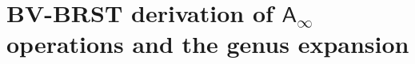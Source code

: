 %

\providecommand{\fg}{\mathfrak{g}}
\providecommand{\fh}{\mathfrak{h}}
\providecommand{\cA}{\mathcal{A}}
\providecommand{\cO}{\mathcal{O}}
\providecommand{\cM}{\mathcal{M}}
\providecommand{\cL}{\mathcal{L}}
\providecommand{\cF}{\mathcal{F}}
\providecommand{\cH}{\mathcal{H}}
\providecommand{\cV}{\mathcal{V}}
\providecommand{\cE}{\mathcal{E}}
\providecommand{\cZ}{\mathcal{Z}}
\providecommand{\cW}{\mathcal{W}}
\providecommand{\cN}{\mathcal{N}}
\providecommand{\cD}{\mathcal{D}}
\providecommand{\bC}{\mathbb{C}}
\providecommand{\bR}{\mathbb{R}}
\providecommand{\bZ}{\mathbb{Z}}
\providecommand{\bQ}{\mathbb{Q}}
\providecommand{\bN}{\mathbb{N}}
\providecommand{\barB}{\bar{B}}
\providecommand{\barBch}{\bar{B}^{\mathrm{ch}}}
\providecommand{\Omegach}{\Omega^{\mathrm{ch}}}
\providecommand{\BBar}{\operatorname{Bar}}
\providecommand{\Cobar}{\operatorname{\Omega}}
\providecommand{\Tr}{\operatorname{Tr}}
\providecommand{\Res}{\operatorname{Res}}
\providecommand{\Sym}{\operatorname{Sym}}
\providecommand{\HH}{\operatorname{HH}}
\providecommand{\CE}{\operatorname{CE}}
\providecommand{\Hom}{\operatorname{Hom}}
\providecommand{\End}{\operatorname{End}}
\providecommand{\id}{\operatorname{id}}
\providecommand{\Spec}{\operatorname{Spec}}
\providecommand{\Obs}{\operatorname{Obs}}
\providecommand{\FM}{\operatorname{FM}}
\providecommand{\Conf}{\operatorname{Conf}}
\providecommand{\Ran}{\operatorname{Ran}}
\providecommand{\h}{\hbar}
\providecommand{\ov}[1]{\overline{#1}}
\providecommand{\Ainf}{\mathsf{A}_{\infty}}
\providecommand{\Linf}{\mathsf{L}_{\infty}}
\providecommand{\SCchtop}{\mathsf{SC}^{\mathrm{ch,top}}}
\providecommand{\Aut}{\operatorname{Aut}}
\providecommand{\Stab}{\operatorname{Stab}}
\providecommand{\Def}{\operatorname{Def}}


\chapter{BV-BRST derivation of \texorpdfstring{$\Ainf$}{A-infinity}
operations and the genus expansion}

